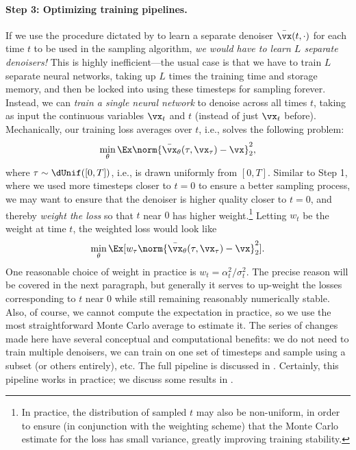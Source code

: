 \documentclass[../../book-main.tex]{subfiles}
\begin{document}
\paragraph{Step 3: Optimizing training pipelines.} If we use the
procedure dictated by  to learn a
separate denoiser \(\bar{\vx}(t, \cdot)\) for each time \(t\) to be
used in the sampling algorithm, \textit{we would have to learn \(L\)
separate denoisers!} This is highly inefficient---the usual case is
that we have to train \(L\) separate neural networks, taking up \(L\)
times the training time and storage memory, and then be locked into
using these timesteps for sampling forever. Instead, we can
\textit{train a single neural network} to denoise across all times
\(t\), taking as input the continuous variables \(\vx_{t}\) and \(t\)
(instead of just \(\vx_{t}\) before). Mechanically, our training loss
averages over \(t\), i.e., solves the following problem:
\begin{equation}\label{eq:training loss}
    \min_{\theta}\Ex\norm{\bar{\vx}_{\theta}(\tau,
    \vx_{\tau}) - \vx}_{2}^{2},
\end{equation}
where \(\tau \sim \dUnif([0, T])\), i.e., is drawn uniformly from \([0, T]\).
Similar to Step 1, where we used more timesteps closer to \(t = 0\)
to ensure a better sampling process, we may want to ensure that the
denoiser is higher quality closer to \(t = 0\), and thereby
\textit{weight the loss} so that \(t\) near \(0\) has higher
weight.\footnote{In practice, the distribution of sampled \(t\) may
    also be non-uniform, in order to ensure (in conjunction with the
    weighting scheme) that the Monte Carlo estimate for the loss has
small variance, greatly improving training stability.}
Letting \(w_{t}\) be the weight at time \(t\), the weighted loss would look like
\begin{equation}\label{eq:parametric_denoising_loss}
    \min_{\theta}\Ex[w_{\tau}\norm{\bar{\vx}_{\theta}(\tau,
    \vx_{\tau}) - \vx}_{2}^{2}].
\end{equation}
One reasonable choice of weight in practice is \(w_{t} =
\alpha_{t}^{2}/\sigma_{t}^{2}\). The precise reason will be covered in the
next paragraph, but generally it serves to up-weight the losses
corresponding to \(t\) near \(0\) while still remaining reasonably
numerically stable. Also, of course, we cannot compute the
expectation in practice, so we use the most straightforward
Monte Carlo average to estimate it. The series of changes made here
have several conceptual and computational benefits: we do not need to
train multiple denoisers, we can train on one set of timesteps and
sample using a subset (or others entirely), etc. The full pipeline is
discussed in . Certainly, this pipeline
works in practice; we discuss some results in
.
\end{document}

